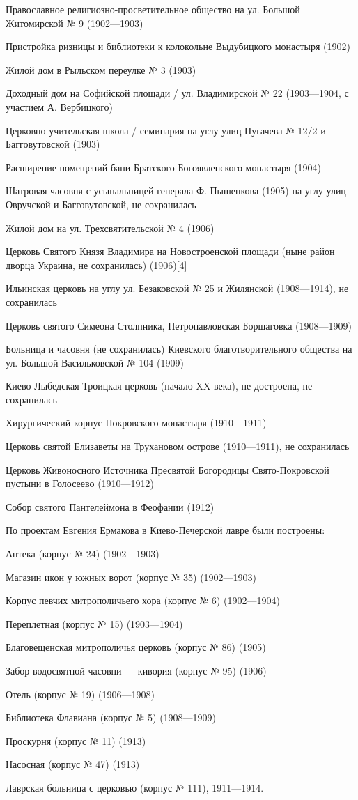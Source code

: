Православное религиозно-просветительное общество на ул. Большой Житомирской № 9 (1902—1903)

Пристройка ризницы и библиотеки к колокольне Выдубицкого монастыря (1902)

Жилой дом в Рыльском переулке № 3 (1903)

Доходный дом на Софийской площади / ул. Владимирской № 22 (1903—1904, с участием А. Вербицкого)

Церковно-учительская школа / семинария на углу улиц Пугачева № 12/2 и Багговутовской (1903)

Расширение помещений бани Братского Богоявленского монастыря (1904)

Шатровая часовня с усыпальницей генерала Ф. Пышенкова (1905) на углу улиц Овручской и Багговутовской, не сохранилась

Жилой дом на ул. Трехсвятительской № 4 (1906)

Церковь Святого Князя Владимира на Новостроенской площади (ныне район дворца Украина, не сохранилась) (1906)[4]

Ильинская церковь на углу ул. Безаковской № 25 и Жилянской (1908—1914), не сохранилась

Церковь святого Симеона Столпника, Петропавловская Борщаговка (1908—1909)

Больница и часовня (не сохранилась) Киевского благотворительного общества на ул. 
Большой Васильковской № 104 (1909)

Киево-Лыбедская Троицкая церковь (начало XX века), не достроена, не сохранилась

Хирургический корпус Покровского монастыря (1910—1911)

Церковь святой Елизаветы на Трухановом 
острове (1910—1911), не сохранилась

Церковь Живоносного Источника Пресвятой Богородицы Свято-Покровской пустыни в Голосеево (1910—1912)

Собор святого Пантелеймона в Феофании (1912)


По проектам Евгения Ермакова в Киево-Печерской лавре были построены:

Аптека (корпус № 24) (1902—1903)

Магазин икон у южных ворот (корпус № 35) (1902—1903)

Корпус певчих митрополичьего хора (корпус № 6) (1902—1904)

Переплетная (корпус № 15) (1903—1904)

Благовещенская митрополичья церковь (корпус № 86) (1905)

Забор водосвятной часовни — кивория (корпус № 95) (1906)

Отель (корпус № 19) (1906—1908)

Библиотека Флавиана (корпус № 5) (1908—1909)

Проскурня (корпус № 11) (1913)

Насосная (корпус № 47) (1913)

Лаврская больница с церковью (корпус № 111), 1911—1914.
